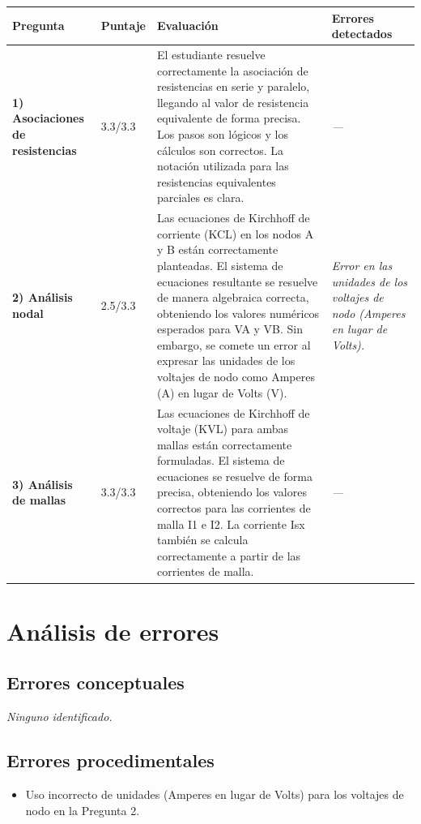 \documentclass[11pt,a4paper]{article}
\begin{document}
\begin{longtable}{>{\bfseries}p{2.8cm} p{1.6cm} p{7.0cm} p{2.8cm}}
  \toprule
  \textbf{Pregunta} & \textbf{Puntaje} & \textbf{Evaluación} & \textbf{Errores detectados} \\
  \midrule
  \endhead
  \bottomrule
  \endfoot
    \textbf{1) Asociaciones de resistencias} & 3.3/3.3 & El estudiante resuelve correctamente la asociación de resistencias en serie y paralelo, llegando al valor de resistencia equivalente de forma precisa. Los pasos son lógicos y los cálculos son correctos. La notación utilizada para las resistencias equivalentes parciales es clara. & \textit{---} \\
    \midrule
    \textbf{2) Análisis nodal} & 2.5/3.3 & Las ecuaciones de Kirchhoff de corriente (KCL) en los nodos A y B están correctamente planteadas. El sistema de ecuaciones resultante se resuelve de manera algebraica correcta, obteniendo los valores numéricos esperados para VA y VB. Sin embargo, se comete un error al expresar las unidades de los voltajes de nodo como Amperes (A) en lugar de Volts (V). & \textit{Error en las unidades de los voltajes de nodo (Amperes en lugar de Volts).} \\
    \midrule
    \textbf{3) Análisis de mallas} & 3.3/3.3 & Las ecuaciones de Kirchhoff de voltaje (KVL) para ambas mallas están correctamente formuladas. El sistema de ecuaciones se resuelve de forma precisa, obteniendo los valores correctos para las corrientes de malla I1 e I2. La corriente Isx también se calcula correctamente a partir de las corrientes de malla. & \textit{---} \\
    \midrule
\end{longtable}

\section*{Análisis de errores}

\subsection*{Errores conceptuales}
\textit{Ninguno identificado.}

\subsection*{Errores procedimentales}
\begin{itemize}[leftmargin=1.5em, itemsep=2pt]
  \item Uso incorrecto de unidades (Amperes en lugar de Volts) para los voltajes de nodo en la Pregunta 2.
\end{itemize}
\end{document}
